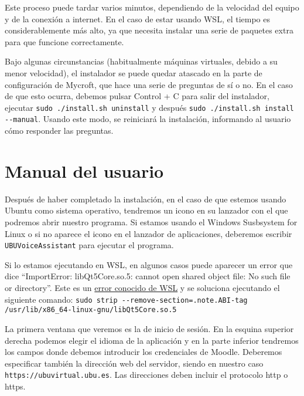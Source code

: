 Este proceso puede tardar varios minutos, dependiendo de la velocidad del equipo y de la conexión a internet. En el caso de estar usando WSL, el tiempo es considerablemente más alto, ya que necesita instalar una serie de paquetes extra para que funcione correctamente.

Bajo algunas circunstancias (habitualmente máquinas virtuales, debido a su menor velocidad), el instalador se puede quedar atascado en la parte de configuración de Mycroft, que hace una serie de preguntas de sí o no. En el caso de que esto ocurra, debemos pulsar Control + C para salir del instalador, ejecutar \texttt{sudo ./install.sh uninstall} y después \texttt{sudo ./install.sh install -{}-manual}. Usando este modo, se reiniciará la instalación, informando al usuario cómo responder las preguntas.

\section{Manual del usuario}
Después de haber completado la instalación, en el caso de que estemos usando Ubuntu como sistema operativo, tendremos un icono en su lanzador con el que podremos abrir nuestro programa. Si estamos usando el Windows Susbsystem for Linux o si no aparece el icono en el lanzador de aplicaciones, deberemos escribir \texttt{UBUVoiceAssistant} para ejecutar el programa.

Si lo estamos ejecutando en WSL, en algunos casos puede aparecer un error que dice ``ImportError: libQt5Core.so.5: cannot open shared object file: No such file or directory''. Este es un \href{https://github.com/microsoft/WSL/issues/3023}{error conocido de WSL} y se soluciona ejecutando el siguiente comando: \newline \texttt{sudo strip -{}-remove-section=.note.ABI-tag \newline /usr/lib/x86\_64-linux-gnu/libQt5Core.so.5}

La primera ventana que veremos es la de inicio de sesión. En la esquina superior derecha podemos elegir el idioma de la aplicación y en la parte inferior tendremos los campos donde debemos introducir los credenciales de Moodle. Deberemos especificar también la dirección web del servidor, siendo en nuestro caso \texttt{https://ubuvirtual.ubu.es}. Las direcciones deben incluir el protocolo http o https.


